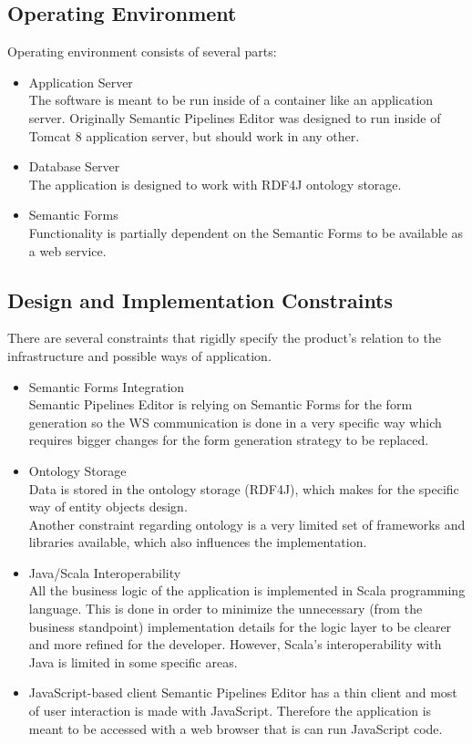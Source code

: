 \documentclass{article}
\begin{document}
\subsection{Operating Environment}
Operating environment consists of several parts:
\begin{itemize}
    \item Application Server\\
	The software is meant to be run inside of a container like an application server. Originally Semantic Pipelines Editor was designed to run inside of Tomcat 8 application server, but should work in any other.
    \item Database Server\\
	The application is designed to work with RDF4J ontology storage.
    \item Semantic Forms\\
	Functionality is partially dependent on the Semantic Forms to be available as a web service.
\end{itemize}
\subsection{Design and Implementation Constraints}
There are several constraints that rigidly specify the product's relation to the infrastructure and possible ways of application.
\begin{itemize}
    \item Semantic Forms Integration\\
	Semantic Pipelines Editor is relying on Semantic Forms for the form generation so the WS communication is done in a very specific way which requires bigger changes for the form generation strategy to be replaced.
    \item Ontology Storage\\
	Data is stored in the ontology storage (RDF4J), which makes for the specific way of entity objects design.\\
	Another constraint regarding ontology is a very limited set of frameworks and libraries available, which also influences the implementation.
    \item Java/Scala Interoperability\\
	All the business logic of the application is implemented in Scala programming language. This is done in order to minimize the unnecessary (from the business standpoint) implementation details for the logic layer to be clearer and more refined for the developer. However, Scala's interoperability with Java is limited in some specific areas.\\
    \item JavaScript-based client
	Semantic Pipelines Editor has a thin client and most of user interaction is made with JavaScript. Therefore the application is meant to be accessed with a web browser that is can run JavaScript code.
\end{itemize}
\end{document}
